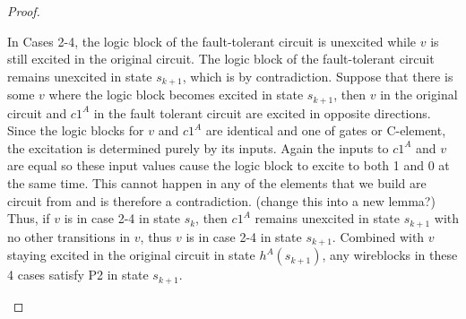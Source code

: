 \documentclass[12pt]{report}
\begin{document}
\begin{proof}
\begin{itemize}
\begin{itemize}
In Cases 2-4, the logic block of the fault-tolerant circuit is unexcited while $v$ is still excited in the original circuit.  The logic block of the fault-tolerant circuit remains unexcited in state $s_{k+1}$, which is by contradiction.  Suppose that there is some $v$ where the logic block becomes excited in state $s_{k+1}$, then $v$ in the original circuit and $c1^A$ in the fault tolerant circuit are excited in opposite directions.  Since the logic blocks for $v$ and $c1^A$ are identical and one of gates or C-element, the excitation is determined purely by its inputs.  Again the inputs to $c1^A$ and $v$ are equal so these input values cause the logic block to excite to both 1 and 0 at the same time.  This cannot happen in any of the elements that we build are circuit from and is therefore a contradiction. (change this into a new lemma?)  
Thus, if $v$ is in case 2-4 in state $s_k$, then $c1^A$ remains unexcited in state $s_{k+1}$ with no other transitions in $v$, thus $v$ is in case 2-4 in state $s_{k+1}$.  
Combined with $v$ staying excited in the original circuit in state $h^A(s_{k+1})$, any wireblocks in these 4 cases satisfy P2 in state $s_{k+1}$.




\end{itemize}
\end{itemize}
\end{proof}
\end{document}
